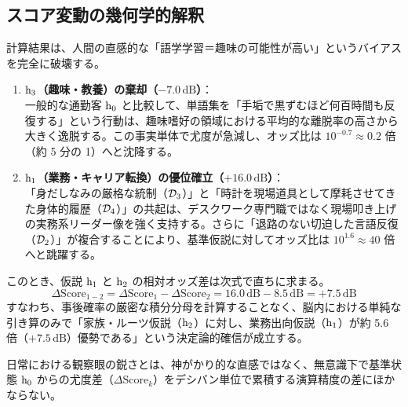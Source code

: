     \subsection{スコア変動の幾何学的解釈}

    計算結果は、人間の直感的な「語学学習＝趣味の可能性が高い」というバイアスを完全に破壊する。

    \begin{enumerate}
        \item \textbf{$\mathrm{h}_3$（趣味・教養）の棄却（$-7.0\,\text{dB}$）}：\\
            一般的な通勤客 $\mathrm{h}_0$ と比較して、単語集を「手垢で黒ずむほど何百時間も反復する」という行動は、趣味嗜好の領域における平均的な離脱率の高さから大きく逸脱する。この事実単体で尤度が急減し、オッズ比は $10^{-0.7} \approx 0.2$ 倍（約 5 分の 1）へと沈降する。

        \item \textbf{$\mathrm{h}_1$（業務・キャリア転換）の優位確立（$+16.0\,\text{dB}$）}：\\
            「身だしなみの厳格な統制（$\mathcal{D}_3$）」と「時計を現場道具として摩耗させてきた身体的履歴（$\mathcal{D}_4$）」の共起は、デスクワーク専門職ではなく現場叩き上げの実務系リーダー像を強く支持する。さらに「退路のない切迫した言語反復（$\mathcal{D}_2$）」が複合することにより、基準仮説に対してオッズ比は $10^{1.6} \approx 40$ 倍へと跳躍する。
    \end{enumerate}

    このとき、仮説 $\mathrm{h}_1$ と $\mathrm{h}_2$ の相対オッズ差は次式で直ちに求まる。
    \begin{equation}
        \Delta \text{Score}_{1 - 2} = \Delta \text{Score}_1 - \Delta \text{Score}_2 = 16.0\,\text{dB} - 8.5\,\text{dB} = +7.5\,\text{dB}
    \end{equation}
    すなわち、事後確率の厳密な積分分母を計算することなく、脳内における単純な引き算のみで「家族・ルーツ仮説（$\mathrm{h}_2$）に対し、業務出向仮説（$\mathrm{h}_1$）が約 5.6 倍（$+7.5\,\text{dB}$）優勢である」という決定論的確信が成立する。

    日常における観察眼の鋭さとは、神がかり的な直感ではなく、無意識下で基準状態 $\mathrm{h}_0$ からの尤度差（$\Delta \text{Score}_k$）をデシバン単位で累積する演算精度の差にほかならない。

\else

